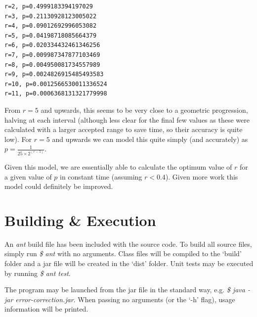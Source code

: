 \documentclass[a4paper,11pt]{article}
\begin{document}
            \begin{verbatim}
r=2, p=0.4999183394197029
r=3, p=0.21130928123005022
r=4, p=0.09012692996053082
r=5, p=0.04198718085664379
r=6, p=0.020334432461346256
r=7, p=0.009987347877103469
r=8, p=0.004950081734557989
r=9, p=0.0024826915485493583
r=10, p=0.0012566530011336524
r=11, p=0.0006368131321779998
            \end{verbatim}

            From $r = 5$ and upwards, this seems to be very close to a geometric progression, halving at each interval (although less clear for the final few values as these were calculated with a larger accepted range to save time, so their accuracy is quite low). For $r = 5$ and upwards we can model this quite simply (and accurately) as $p=\frac{1}{25\times2^{(r - 5)}}$.

            Given this model, we are essentially able to calculate the optimum value of $r$ for a given value of $p$ in constant time (assuming $r < 0.4$). Given more work this model could definitely be improved.

\section{Building \& Execution}
    An \textit{ant} build file has been included with the source code. To build all source files, simply run \textit{\$ ant} with no arguments. Class files will be compiled to the `build' folder and a jar file will be created in the `dist' folder. Unit tests may be executed by running \textit{\$ ant test}.

    The program may be launched from the jar file in the standard way, e.g. \textit{\$ java -jar error-correction.jar}. When passing no arguments (or the `-h' flag), usage information will be printed.
\end{document}
